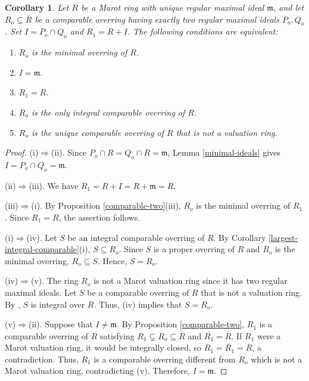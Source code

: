 \documentclass[12pt]{article}
\newtheorem{corollary}{Corollary}
\begin{document}
\begin{corollary}\label{two-minimal-equivalences}
		Let $R$ be a Marot ring with unique regular maximal ideal $\mathfrak{m}$, and let $R_o\subseteq\overline R$ be a comparable overring having exactly two regular maximal ideals $P_o,Q_o$. Set $I=P_o\cap Q_o$ and $R_1=R+I$. The following conditions are equivalent:
		\begin{enumerate}[label=(\roman*)]
			\item $R_o$ is the minimal overring of $R$.
			\item $I=\mathfrak{m}$.
			\item $R_1=R$.
			\item $R_o$ is the only integral comparable overring of $R$.
			\item $R_o$ is the unique comparable overring of $R$ that is not a valuation ring.
		\end{enumerate}
	\end{corollary}
	\begin{proof}
		(i)$\Rightarrow$(ii). Since $P_o\cap R=Q_o\cap R=\mathfrak{m}$, Lemma \ref{minimal-ideals} gives $I=P_o\cap Q_o=\mathfrak{m}$.
		
		(ii)$\Rightarrow$(iii). We have $R_1=R+I=R+\mathfrak{m}=R$.
		
		(iii)$\Rightarrow$(i). By Proposition \ref{comparable-two}(iii), $R_o$ is the minimal overring of $R_1$. Since $R_1=R$, the assertion follows.
		
		(i)$\Rightarrow$(iv). Let $S$ be an integral comparable overring of $R$. By Corollary \ref{largest-integral-comparable}(i), $S\subseteq R_o$. Since $S$ is a proper overring of $R$ and $R_o$ is the minimal overring, $R_o\subseteq S$. Hence, $S=R_o$.
		
		(iv)$\Rightarrow$(v). The ring $R_o$ is not a Marot valuation ring since it has two regular maximal ideals. Let $S$ be a comparable overring of $R$ that is not a valuation ring. By \cite[Proposition 3.2]{marot}, $S$ is integral over $R$. Thus, (iv) implies that $S=R_o$.
		
		(v)$\Rightarrow$(ii). Suppose that $I\neq\mathfrak{m}$. By Proposition \ref{comparable-two}, $R_1$ is a comparable overring of $R$ satisfying $R_1\subsetneq R_o\subseteq\overline R$ and $\overline{R_1}=\overline R$. If $R_1$ were a Marot valuation ring, it would be integrally closed, so $R_1=\overline{R_1}=\overline R$, a contradiction. Thus, $R_1$ is a comparable overring different from $R_o$ which is not a Marot valuation ring, contradicting (v). Therefore, $I=\mathfrak{m}$.
	\end{proof}
\end{document}
